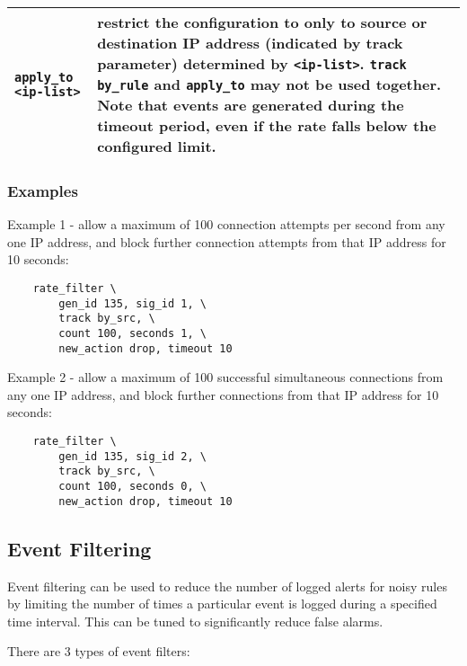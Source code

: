 \documentclass[english]{report}
\begin{document}
\begin{table}[h]
\begin{center}
\begin{tabular}{| p{2in} | p{4in} |}
\hline
\texttt{apply\_to <ip-list>} &

restrict the configuration to only to source or destination IP address
(indicated by track parameter) determined by \texttt{<ip-list>}.  \texttt{track
by\_rule} and \texttt{apply\_to} may not be used together.  Note that events
are generated during the timeout period, even if the rate falls below the
configured limit.\\

\hline
\end{tabular}
\end{center}
\end{table}

\subsubsection{Examples}

Example 1 - allow a maximum of 100 connection attempts per second from any one
IP address, and block further connection attempts from that IP address for 10
seconds:

\begin{verbatim}
    rate_filter \
        gen_id 135, sig_id 1, \
        track by_src, \
        count 100, seconds 1, \
        new_action drop, timeout 10
\end{verbatim}

Example 2 - allow a maximum of 100 successful simultaneous connections from any
one IP address, and block further connections from that IP address for 10
seconds:

\begin{verbatim}
    rate_filter \
        gen_id 135, sig_id 2, \
        track by_src, \
        count 100, seconds 0, \
        new_action drop, timeout 10
\end{verbatim}

\subsection{Event Filtering}
\label{event_filtering}

Event filtering can be used to reduce the number of logged alerts for noisy
rules by limiting the number of times a particular event is logged during a
specified time interval.  This can be tuned to significantly reduce false
alarms.

There are 3 types of event filters:
\end{document}
